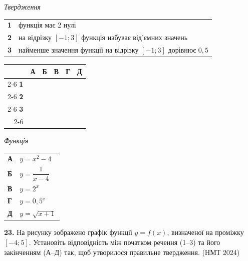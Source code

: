 \documentclass[14pt]{extarticle}
\newcommand{\nmtyear}[1]{\hfill{\small\color{yearcolor}(НМТ #1)}}
\begin{document}
\noindent
\begin{minipage}[t]{0.50\textwidth}
    \textit{Твердження} \par \vspace{0.2cm}
    \begin{tabular}{@{}p{0.5cm} p{6.5cm}@{}}
    \textbf{1} & функція має 2 нулі \\
    \textbf{2} & на відрізку $[-1; 3]$ функція набуває від'ємних значень \\
    \textbf{3} & найменше значення функції на відрізку $[-1; 3]$ дорівнює $0{,}5$ \\
    \end{tabular}
    
    \vspace{0.3cm}
    
    \begingroup
    \setlength{\tabcolsep}{4pt}
    \renewcommand{\arraystretch}{1.2}
    \small
    \begin{tabular}{r|c|c|c|c|c|}
         \multicolumn{1}{c}{} & \multicolumn{1}{c}{\textbf{А}} & \multicolumn{1}{c}{\textbf{Б}} & \multicolumn{1}{c}{\textbf{В}} & \multicolumn{1}{c}{\textbf{Г}} & \multicolumn{1}{c}{\textbf{Д}} \\ \cline{2-6}
         \textbf{1} & & & & & \\ \cline{2-6}
         \textbf{2} & & & & & \\ \cline{2-6}
         \textbf{3} & & & & & \\ \cline{2-6}
    \end{tabular}
    \endgroup
\end{minipage}%
\hfill
\begin{minipage}[t]{0.45\textwidth}
    \textit{Функція} \par \vspace{0.2cm}
    \begin{tabular}{ll}
    \textbf{А} & $y = x^2 - 4$ \\[0.2cm]
    \textbf{Б} & $y = \dfrac{1}{x-4}$ \\[0.2cm]
    \textbf{В} & $y = 2^x$ \\[0.2cm]
    \textbf{Г} & $y = 0{,}5^x$ \\[0.2cm]
    \textbf{Д} & $y = \sqrt{x+1}$ \\
    \end{tabular}
\end{minipage}

\vspace{0.7cm}

\noindent\textbf{23.} На рисунку зображено графік функції $y=f(x)$, визначеної на проміжку $[-4; 5]$. Установіть відповідність між початком речення (1--3) та його закінченням (А--Д) так, щоб утворилося правильне твердження. \nmtyear{2024}
\end{document}
